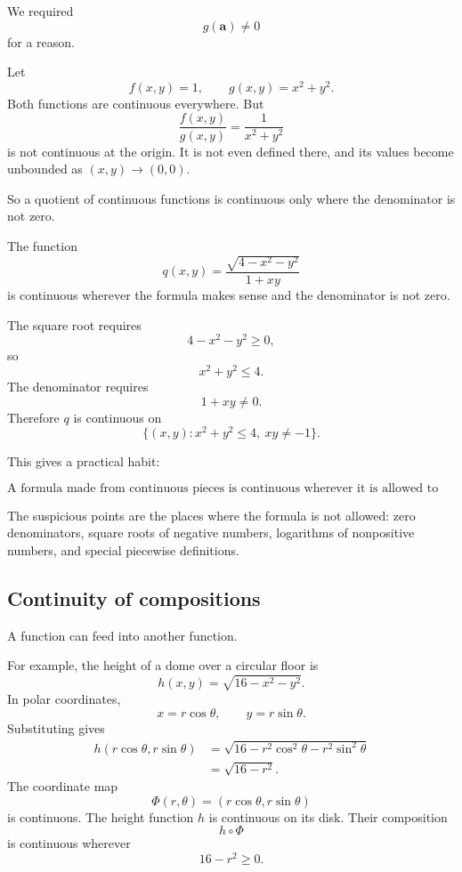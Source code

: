 We required
\[
    g(\mathbf a)\ne0
\]
for a reason.

\begin{example}
Let
\[
    f(x,y)=1,
    \qquad
    g(x,y)=x^2+y^2.
\]
Both functions are continuous everywhere.  But
\[
    \frac{f(x,y)}{g(x,y)}
    =
    \frac{1}{x^2+y^2}
\]
is not continuous at the origin.  It is not even defined there, and its values become
unbounded as \((x,y)\to(0,0)\).

So a quotient of continuous functions is continuous only where the denominator is not
zero.
\end{example}

\begin{example}
The function
\[
    q(x,y)=\frac{\sqrt{4-x^2-y^2}}{1+xy}
\]
is continuous wherever the formula makes sense and the denominator is not zero.

The square root requires
\[
    4-x^2-y^2\ge0,
\]
so
\[
    x^2+y^2\le4.
\]
The denominator requires
\[
    1+xy\ne0.
\]
Therefore \(q\) is continuous on
\[
    \{(x,y):x^2+y^2\le4,\ xy\ne -1\}.
\]
\end{example}

This gives a practical habit:

\[
    \text{A formula made from continuous pieces is continuous wherever it is allowed to be.}
\]

The suspicious points are the places where the formula is not allowed: zero denominators,
square roots of negative numbers, logarithms of nonpositive numbers, and special
piecewise definitions.

\subsection{Continuity of compositions}

A function can feed into another function.

For example, the height of a dome over a circular floor is
\[
    h(x,y)=\sqrt{16-x^2-y^2}.
\]
In polar coordinates,
\[
    x=r\cos\theta,\qquad y=r\sin\theta.
\]
Substituting gives
\[
\begin{aligned}
    h(r\cos\theta,r\sin\theta)
    &=
    \sqrt{16-r^2\cos^2\theta-r^2\sin^2\theta}\\
    &=
    \sqrt{16-r^2}.
\end{aligned}
\]
The coordinate map
\[
    \Phi(r,\theta)=(r\cos\theta,r\sin\theta)
\]
is continuous.  The height function \(h\) is continuous on its disk.  Their composition
\[
    h\circ \Phi
\]
is continuous wherever
\[
    16-r^2\ge0.
\]

